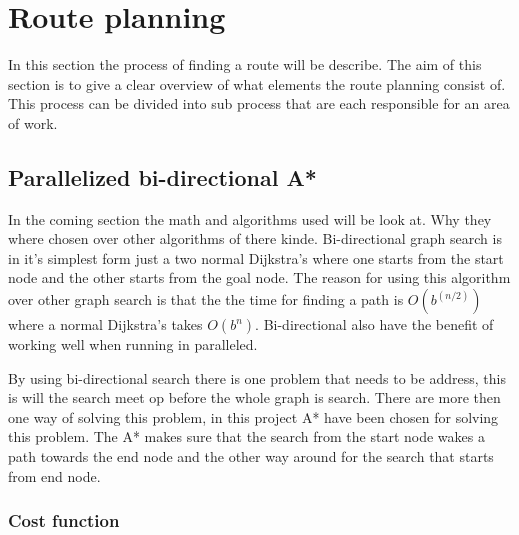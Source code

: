 \section{Route planning}
In this section the process of finding a route will be describe.
The aim of this section is to give a clear overview of what elements the route planning consist of.
This process can be divided into sub process that are each responsible for an area of work.

\subsection{Parallelized bi-directional A*} \label{algorithms}

In the coming section the math and algorithms used will be look at. Why they where chosen over other algorithms of there kinde.
Bi-directional graph search is in it's simplest form just a two normal Dijkstra’s where one starts from the start node and the other starts from the goal node.
The reason for using this algorithm over other graph search is that the the time for finding a path is $O(b^{(n/2)})$ where a normal Dijkstra’s takes $O(b^{n})$. Bi-directional also have the benefit of working well when running in paralleled.



By using bi-directional search there is one problem that needs to be address, this is will the search meet op before the whole graph is search. There are more then one way of solving this problem, in this project A* have been chosen for solving this problem. The A* makes sure that the search from the start node wakes a path towards the end node and the other way around for the search that starts from end node.

\subsubsection{Cost function}
